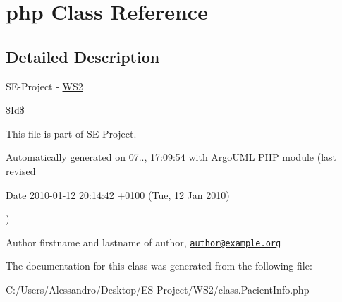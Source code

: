 \hypertarget{class_1_1_pacient_info_1_1php}{\section{php Class Reference}
\label{class_1_1_pacient_info_1_1php}
}


\subsection{Detailed Description}
S\+E-\/\+Project -\/ \hyperlink{namespace_w_s2}{W\+S2}

\$\+Id\$

This file is part of S\+E-\/\+Project.

Automatically generated on 07.., 17\+:09\+:54 with Argo\+U\+M\+L P\+H\+P module (last revised \begin{DoxyParagraph}{Date}
2010-\/01-\/12 20\+:14\+:42 +0100 (Tue, 12 Jan 2010) 
\end{DoxyParagraph}
)

\begin{DoxyAuthor}{Author}
firstname and lastname of author, \href{mailto:author@example.org}{\tt author@example.\+org} 
\end{DoxyAuthor}


The documentation for this class was generated from the following file\+:\begin{DoxyCompactItemize}
\item 
C\+:/\+Users/\+Alessandro/\+Desktop/\+E\+S-\/\+Project/\+W\+S2/class.\+Pacient\+Info.\+php\end{DoxyCompactItemize}
